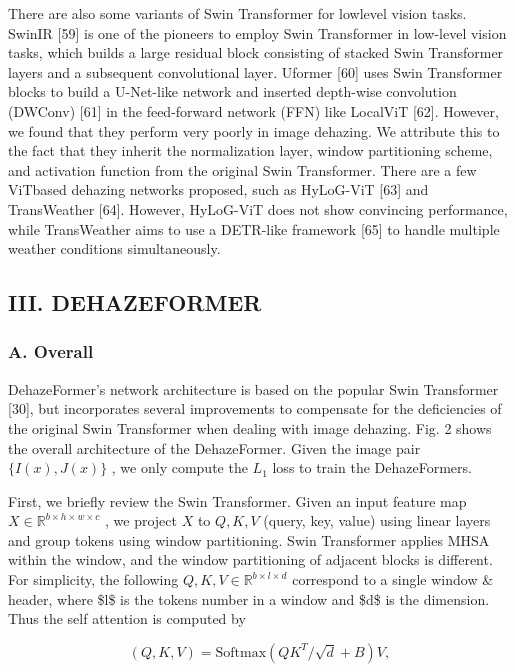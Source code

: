 There are also some variants of Swin Transformer for lowlevel vision tasks. SwinIR [59] is one of the pioneers to employ Swin Transformer in low-level vision tasks, which builds a large residual block consisting of stacked Swin Transformer layers and a subsequent convolutional layer. Uformer [60] uses Swin Transformer blocks to build a U-Net-like network and inserted depth-wise convolution (DWConv) [61] in the feed-forward network (FFN) like LocalViT [62]. However, we found that they perform very poorly in image dehazing. We attribute this to the fact that they inherit the normalization layer, window partitioning scheme, and activation function from the original Swin Transformer. There are a few ViTbased dehazing networks proposed, such as HyLoG-ViT [63] and TransWeather [64]. However, HyLoG-ViT does not show convincing performance, while TransWeather aims to use a DETR-like framework [65] to handle multiple weather conditions simultaneously.

\subsection{III. DEHAZEFORMER}

\subsubsection{A. Overall}

DehazeFormer’s network architecture is based on the popular Swin Transformer [30], but incorporates several improvements to compensate for the deficiencies of the original Swin Transformer when dealing with image dehazing. Fig. 2 shows the overall architecture of the DehazeFormer. Given the image pair $\{I(x),J(x)\}$ , we only compute the $L_{1}$ loss to train the DehazeFormers.

First, we briefly review the Swin Transformer. Given an input feature map $X\in\mathbb{R}^{b\times h\times w\times c}$ , we project $X$ to $Q,K,V$ (query, key, value) using linear layers and group tokens using window partitioning. Swin Transformer applies MHSA within the window, and the window partitioning of adjacent blocks is different. For simplicity, the following $Q,K,V\in\mathbb{R}^{b\times l\times d}$ correspond to a single window \& header, where \$l\$ is the tokens number in a window and \$d\$ is the dimension. Thus the self attention is computed by

\begin{equation}
(Q,K,V)=\mathrm{Softmax}\left(Q K^{T}/\sqrt{d}+B\right)V,
\end{equation}

